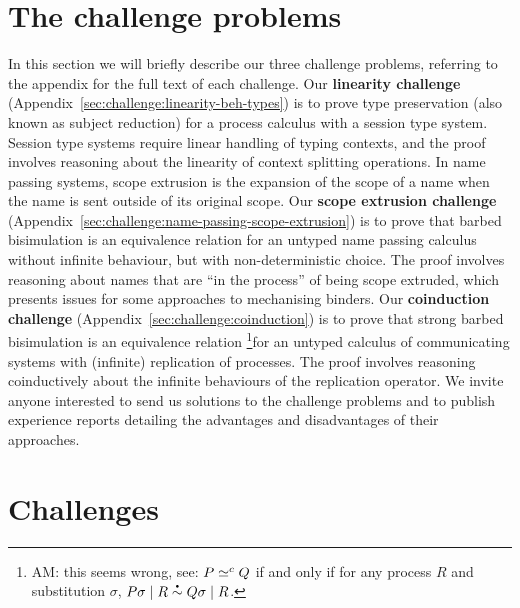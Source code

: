 \documentclass[runningheads]{llncs}
\begin{document}
\section{The challenge problems}
In this section we will briefly describe our three challenge problems, referring to the appendix for the full text of each challenge.
Our \textbf{linearity challenge} (Appendix~\ref{sec:challenge:linearity-beh-types}) is to prove type preservation (also known as subject reduction) for a process calculus with a session type system.
Session type systems require linear handling of typing contexts, and the proof involves reasoning about the linearity of context splitting operations.
In name passing systems, scope extrusion is the expansion of the scope of a name when the name is sent outside of its original scope.
Our \textbf{scope extrusion challenge} (Appendix~\ref{sec:challenge:name-passing-scope-extrusion}) is to prove that barbed bisimulation is an equivalence relation for an untyped name passing calculus without infinite behaviour, but with non-deterministic choice.
The proof involves reasoning about names that are ``in the process'' of being scope extruded, which presents issues for some approaches to mechanising binders.
Our \textbf{coinduction challenge} (Appendix~\ref{sec:challenge:coinduction}) is to prove that strong barbed bisimulation is an equivalence relation \footnote{AM: this seems wrong, see:  \( P \simeq^c Q \) if and only if for any process \( R \) and substitution \( \sigma \), \( \sbbisim{\Ppar{\applysubst{\sigma}{P}}{R}}{\Ppar{\applysubst{\sigma}{Q}}{R}} \).}for an untyped calculus of communicating systems with (infinite) replication of processes.
The proof involves reasoning coinductively about the infinite behaviours of the replication operator.
We invite anyone interested to send us solutions to the challenge problems and to publish experience reports detailing the advantages and disadvantages of their approaches.


\appendix
\section{Challenges}




\end{document}
